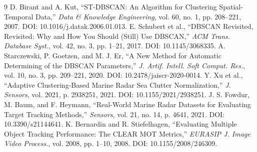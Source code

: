\documentclass[12pt]{article}
\begin{document}
\begin{thebibliography}{9}
 D. Birant and A. Kut, ``ST-DBSCAN: An Algorithm for Clustering Spatial-Temporal Data,'' \textit{Data \& Knowledge Engineering}, vol. 60, no. 1, pp. 208--221, 2007. DOI: 10.1016/j.datak.2006.01.013.
 E. Schubert et al., ``DBSCAN Revisited, Revisited: Why and How You Should (Still) Use DBSCAN,'' \textit{ACM Trans. Database Syst.}, vol. 42, no. 3, pp. 1--21, 2017. DOI: 10.1145/3068335.
 A. Starczewski, P. Goetzen, and M. J. Er, ``A New Method for Automatic Determining of the DBSCAN Parameters,'' \textit{J. Artif. Intell. Soft Comput. Res.}, vol. 10, no. 3, pp. 209--221, 2020. DOI: 10.2478/jaiscr-2020-0014.
 Y. Xu et al., ``Adaptive Clustering-Based Marine Radar Sea Clutter Normalization,'' \textit{J. Sensors}, vol. 2021, p. 2938251, 2021. DOI: 10.1155/2021/2938251.
 J. S. Fowdur, M. Baum, and F. Heymann, ``Real-World Marine Radar Datasets for Evaluating Target Tracking Methods,'' \textit{Sensors}, vol. 21, no. 14, p. 4641, 2021. DOI: 10.3390/s21144641.
 K. Bernardin and R. Stiefelhagen, ``Evaluating Multiple Object Tracking Performance: The CLEAR MOT Metrics,'' \textit{EURASIP J. Image Video Process.}, vol. 2008, pp. 1--10, 2008. DOI: 10.1155/2008/246309.
\end{thebibliography}
\end{document}
